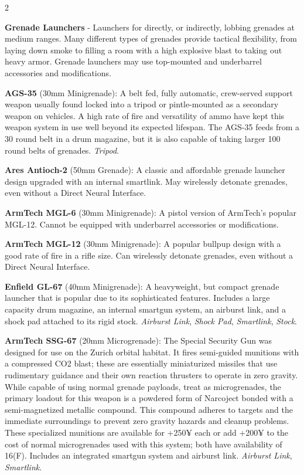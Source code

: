 \documentclass[
  oneside]{article}
\begin{document}
\begin{multicols}{2}

\textbf{Grenade Launchers} - Launchers for
directly, or indirectly, lobbing grenades at
medium ranges. Many different types of grenades
provide tactical flexibility, from laying down
smoke to filling a room with a high explosive
blast to taking out heavy armor. Grenade launchers
may use top-mounted and underbarrel accessories
and modifications.

\textbf{AGS-35} (30mm Minigrenade): A belt fed,
fully automatic, crew-served support weapon
usually found locked into a tripod or
pintle-mounted as a secondary weapon on vehicles.
A high rate of fire and versatility of ammo have
kept this weapon system in use well beyond its
expected lifespan. The AGS-35 feeds from a 30
round belt in a drum magazine, but it is also
capable of taking larger 100 round belts of
grenades. \emph{Tripod}.

\textbf{Ares Antioch-2} (50mm Grenade): A classic
and affordable grenade launcher design upgraded
with an internal smartlink. May wirelessly
detonate grenades, even without a Direct Neural
Interface.

\textbf{ArmTech MGL-6} (30mm Minigrenade): A
pistol version of ArmTech's popular MGL-12. Cannot
be equipped with underbarrel accessories or
modifications.

\textbf{ArmTech MGL-12} (30mm Minigrenade): A
popular bullpup design with a good rate of fire in
a rifle size. Can wirelessly detonate grenades,
even without a Direct Neural Interface.

\textbf{Enfield GL-67} (40mm Minigrenade): A
heavyweight, but compact grenade launcher that is
popular due to its sophisticated features.
Includes a large capacity drum magazine, an
internal smartgun system, an airburst link, and a
shock pad attached to its rigid stock.
\emph{Airburst Link}, \emph{Shock Pad},
\emph{Smartlink}, \emph{Stock}.

\textbf{ArmTech SSG-67} (20mm Microgrenade): The
Special Security Gun was designed for use on the
Zurich orbital habitat. It fires semi-guided
munitions with a compressed CO2 blast; these are
essentially miniaturized missiles that use
rudimentary guidance and their own reaction
thrusters to operate in zero gravity. While
capable of using normal grenade payloads, treat as
microgrenades, the primary loadout for this weapon
is a powdered form of Narcoject bonded with a
semi-magnetized metallic compound. This compound
adheres to targets and the immediate surroundings
to prevent zero gravity hazards and cleanup
problems. These specialized munitions are
available for +250¥ each or add +200¥ to the cost
of normal microgrenades used with this system;
both have availability of 16(F). Includes an
integrated smartgun system and airburst link.
\emph{Airburst Link}, \emph{Smartlink}.


\end{multicols}
\end{document}
